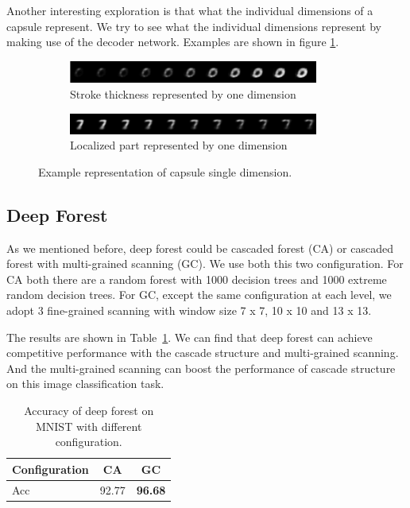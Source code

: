 \documentclass{article} %
\begin{document}
Another interesting exploration is that what the individual dimensions of a capsule represent. We try to see what the individual dimensions represent by making use of the decoder network. Examples are shown in figure \ref{fig:newdigit}.

\begin{figure}[htbp]
	\centering
	\begin{subfigure}[b]{0.9\textwidth}
		\centering
		\includegraphics[width=0.9\textwidth]{figs/0.png}
		\caption{Stroke thickness represented by one dimension}
	\end{subfigure}
	\begin{subfigure}[b]{0.9\textwidth}
		\centering
		\includegraphics[width=0.9\textwidth]{figs/7.png}
		\caption{Localized part represented by one dimension}
	\end{subfigure}
	\caption{Example representation of capsule single dimension.}
	\label{fig:newdigit}
\end{figure}

\subsection{Deep Forest}
As we mentioned before, deep forest could be cascaded forest (CA) or cascaded forest with multi-grained scanning (GC). We use both this two configuration. For CA both there are a random forest with 1000 decision trees and 1000 extreme random decision trees. For GC, except the same configuration at each level, we adopt 3 fine-grained scanning with window size 7 x 7, 10 x 10 and 13 x 13.

The results are shown in Table~\ref{tab:deep-forest}. We can find that deep forest can achieve competitive performance with the cascade structure and multi-grained scanning. And the multi-grained scanning can boost the performance of cascade structure on this image classification task.
	\begin{table}[h]
		\centering
		\begin{tabular}{l|cc}
			\toprule
			Configuration&CA&GC\\
			\midrule
			Acc&92.77&\textbf{96.68}\\
			
			\bottomrule	
		\end{tabular}
		\caption{Accuracy of deep forest on MNIST with different configuration. }
		\label{tab:deep-forest}
	\end{table}
\end{document}
